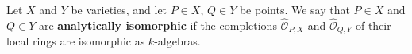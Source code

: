 Let $X$ and $Y$ be varieties, and let $P \in X$, $Q \in Y$ be points. We say that $P \in X$ and $Q \in Y$ are \textbf{analytically isomorphic} if the completions $\hat{\mathcal{O}}_{P,X}$ and $\hat{\mathcal{O}}_{Q,Y}$ of their local rings are isomorphic as $k$-algebras.
